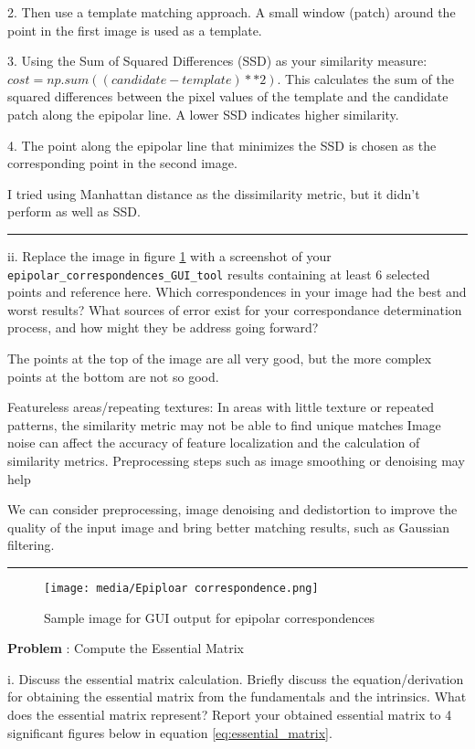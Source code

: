 \documentclass[onecolumn,10pt]{article}
\begin{document}
2. Then use a template matching approach.  A small window (patch) around the point in the first image is used as a template.

3. Using the Sum of Squared Differences (SSD) as your similarity measure: $cost = np.sum((candidate - template) ** 2)$.  This calculates the sum of the squared differences between the pixel values of the template and the candidate patch along the epipolar line. A lower SSD indicates higher similarity.

4. The point along the epipolar line that minimizes the SSD is chosen as the corresponding point in the second image.


I tried using Manhattan distance as the dissimilarity metric, but it didn’t perform as well as SSD.
\hrule
ii. Replace the image in figure \ref{fig:epipolar_corresp} with a screenshot of your {\tt epipolar\_correspondences\_GUI\_tool} results containing at least 6 selected points and reference here. Which correspondences in your image had the best and worst results? What sources of error exist for your correspondance determination process, and how might they be address going forward?

The points at the top of the image are all very good, but the more complex points at the bottom are not so good.

Featureless areas/repeating textures: In areas with little texture or repeated patterns, the similarity metric may not be able to find unique matches
Image noise can affect the accuracy of feature localization and the calculation of similarity metrics. Preprocessing steps such as image smoothing or denoising may help

We can consider preprocessing, image denoising and dedistortion to improve the quality of the input image and bring better matching results, such as Gaussian filtering.
\hrule
\begin{figure}
  \centering
  \texttt{[image: media/Epiploar correspondence.png]} %
  \caption{Sample image for GUI output for epipolar correspondences}
  \label{fig:epipolar_corresp}
\end{figure}

\addtocounter{problemnumber}{1}
\noindent\textbf{Problem }:  Compute the Essential Matrix

i. Discuss the essential matrix calculation. Briefly discuss the equation/derivation for obtaining the essential matrix from the fundamentals and the intrinsics. What does the essential matrix represent? Report your obtained essential matrix to 4 significant figures below in equation \ref{eq:essential_matrix}.
\end{document}
